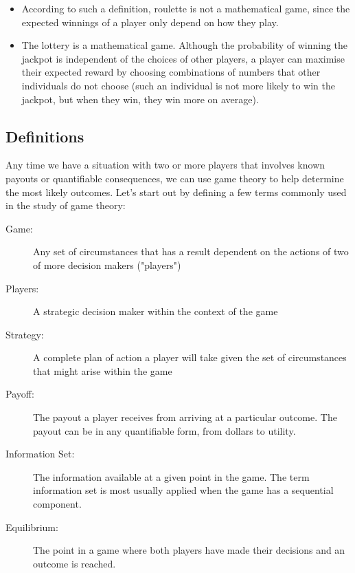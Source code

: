 \documentclass[]{report}
\begin{document}
\begin{itemize}
	\item According to such a definition, roulette is not a mathematical
	game, since the expected winnings of a player only depend on how
	they play.
	\item The lottery is a mathematical game. Although the probability of
	winning the jackpot is independent of the choices of other players,
	a player can maximise their expected reward by choosing
	combinations of numbers that other individuals do not choose
	(such an individual is not more likely to win the jackpot, but when
	they win, they win more on average).
\end{itemize}




\subsection{Definitions} 
Any time we have a situation with two or more players that involves known payouts or quantifiable consequences, we can use game theory to help determine the most likely outcomes. 
Let's start out by defining a few terms commonly used in the study of game theory:

\begin{description}
	\item[Game:] Any set of circumstances that has a result dependent on the actions of two of more decision makers ("players")
	\item[Players:] A strategic decision maker within the context of the game
	\item[Strategy:] A complete plan of action a player will take given the set of circumstances that might arise within the game
	\item[Payoff:] The payout a player receives from arriving at a particular outcome. The payout can be in any quantifiable form, from dollars to utility.
	\item[Information Set:] The information available at a given point in the game. The term information set is most usually applied when the game has a sequential component.
	\item[Equilibrium:] The point in a game where both players have made their decisions and an outcome is reached.
\end{description}
\end{document}
